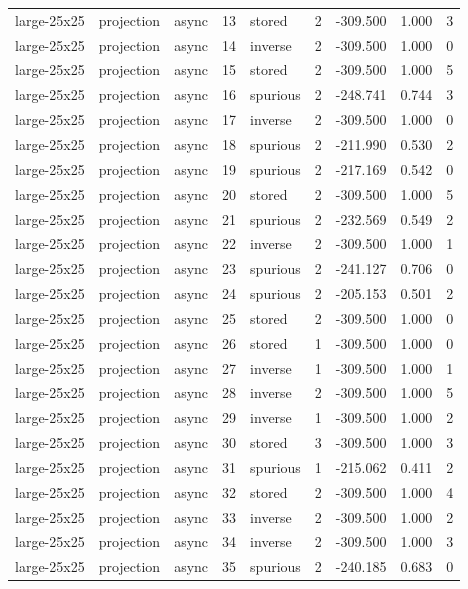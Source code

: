 \begin{tabular}{lllrlrrrr}
large-25x25 & projection & async & 13 & stored & 2 & -309.500 & 1.000 & 3 \\
large-25x25 & projection & async & 14 & inverse & 2 & -309.500 & 1.000 & 0 \\
large-25x25 & projection & async & 15 & stored & 2 & -309.500 & 1.000 & 5 \\
large-25x25 & projection & async & 16 & spurious & 2 & -248.741 & 0.744 & 3 \\
large-25x25 & projection & async & 17 & inverse & 2 & -309.500 & 1.000 & 0 \\
large-25x25 & projection & async & 18 & spurious & 2 & -211.990 & 0.530 & 2 \\
large-25x25 & projection & async & 19 & spurious & 2 & -217.169 & 0.542 & 0 \\
large-25x25 & projection & async & 20 & stored & 2 & -309.500 & 1.000 & 5 \\
large-25x25 & projection & async & 21 & spurious & 2 & -232.569 & 0.549 & 2 \\
large-25x25 & projection & async & 22 & inverse & 2 & -309.500 & 1.000 & 1 \\
large-25x25 & projection & async & 23 & spurious & 2 & -241.127 & 0.706 & 0 \\
large-25x25 & projection & async & 24 & spurious & 2 & -205.153 & 0.501 & 2 \\
large-25x25 & projection & async & 25 & stored & 2 & -309.500 & 1.000 & 0 \\
large-25x25 & projection & async & 26 & stored & 1 & -309.500 & 1.000 & 0 \\
large-25x25 & projection & async & 27 & inverse & 1 & -309.500 & 1.000 & 1 \\
large-25x25 & projection & async & 28 & inverse & 2 & -309.500 & 1.000 & 5 \\
large-25x25 & projection & async & 29 & inverse & 1 & -309.500 & 1.000 & 2 \\
large-25x25 & projection & async & 30 & stored & 3 & -309.500 & 1.000 & 3 \\
large-25x25 & projection & async & 31 & spurious & 1 & -215.062 & 0.411 & 2 \\
large-25x25 & projection & async & 32 & stored & 2 & -309.500 & 1.000 & 4 \\
large-25x25 & projection & async & 33 & inverse & 2 & -309.500 & 1.000 & 2 \\
large-25x25 & projection & async & 34 & inverse & 2 & -309.500 & 1.000 & 3 \\
large-25x25 & projection & async & 35 & spurious & 2 & -240.185 & 0.683 & 0 \\

\end{tabular}
